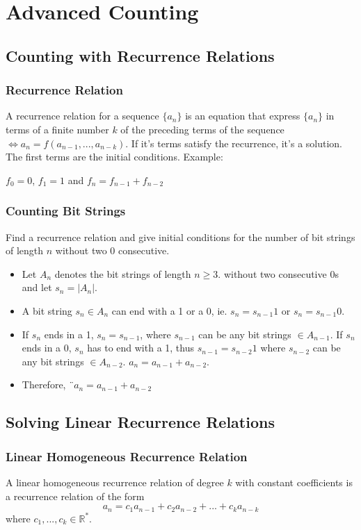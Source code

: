\documentclass{article}
\begin{document}
\section{Advanced Counting}
\subsection{Counting with Recurrence Relations}
\subsubsection{Recurrence Relation} A recurrence relation for a sequence $ \{a_n\} $ is an equation that express $ \{a_n\} $ in terms of a finite number $ k $ of the preceding terms of the sequence $ \Leftrightarrow a_n = f(a_{n-1},...,a_{n-k}) $. If it's terms satisfy the recurrence, it's a solution. The first terms are the initial conditions. Example:
\begin{center}
$ f_0 = 0 $, $ f_1 = 1 $ and $ f_n = f_{n-1} + f_{n-2} $
\end{center}

\subsubsection{Counting Bit Strings} Find a recurrence relation and give initial conditions for the number of bit strings of length $ n $ without two 0 consecutive.
\begin{itemize}
\item Let $ A_n $ denotes the bit strings of length $ n \geq 3 $. without two consecutive 0s and let $ s_n = |A_n| $.
\item A bit string $ s_n \in A_n $ can end with a 1 or a 0, ie. $ s_n = s_{n-1}1 $ or $ s_n = s_{n-1}0 $.
\item If $ s_n $ ends in a 1, $ s_n = s_{n-1} $, where $ s_{n-1} $ can be any bit strings $ \in A_{n-1} $. If $ s_n $ ends in a 0, $ s_n $ has to end with a 1, thus $ s_{n-1} = s_{n-2}1 $ where $ s_{n-2} $ can be any bit strings $ \in A_{n-2} $. $ a_n = a_{n-1} + a_{n-2} $.
\item Therefore, $¨a_n = a_{n-1} + a_{n-2} $
\end{itemize}

\subsection{Solving Linear Recurrence Relations}
\subsubsection{Linear Homogeneous Recurrence Relation} A linear homogeneous recurrence relation of degree $ k $ with constant coefficients is a recurrence relation of the form 
\begin{equation}
a_n = c_1a_{n-1} + c_2a_{n-2} + ... + c_ka_{n-k}
\end{equation}
where $ c_1,...,c_k \in \mathbb{R^{*}} $.
\end{document}
